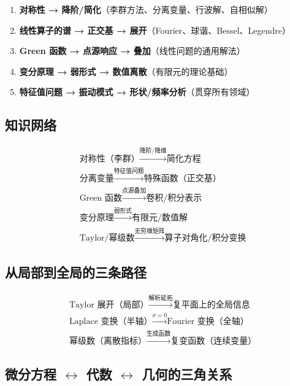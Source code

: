 \begin{enumerate}
  \item \textbf{对称性 → 降阶/简化}（李群方法、分离变量、行波解、自相似解）
  \item \textbf{线性算子的谱 → 正交基 → 展开}（Fourier、球谐、Bessel、Legendre）
  \item \textbf{Green 函数 → 点源响应 → 叠加}（线性问题的通用解法）
  \item \textbf{变分原理 → 弱形式 → 数值离散}（有限元的理论基础）
  \item \textbf{特征值问题 → 振动模式 → 形状/频率分析}（贯穿所有领域）
\end{enumerate}

\subsection{知识网络}

\[
\boxed{
\begin{aligned}
&\text{对称性（李群）} \xrightarrow{\text{降阶/降维}} \text{简化方程} \\
&\text{分离变量} \xrightarrow{\text{特征值问题}} \text{特殊函数（正交基）} \\
&\text{Green 函数} \xrightarrow{\text{点源叠加}} \text{卷积/积分表示} \\
&\text{变分原理} \xrightarrow{\text{弱形式}} \text{有限元/数值解} \\
&\text{Taylor/幂级数} \xrightarrow{\text{无穷维矩阵}} \text{算子对角化/积分变换}
\end{aligned}
}
\]

\subsection{从局部到全局的三条路径}

\[
\boxed{
\begin{aligned}
&\text{Taylor 展开（局部）} \xrightarrow{\text{解析延拓}} \text{复平面上的全局信息} \\
&\text{Laplace 变换（半轴）} \xrightarrow{\sigma = 0} \text{Fourier 变换（全轴）} \\
&\text{幂级数（离散指标）} \xrightarrow{\text{生成函数}} \text{复变函数（连续变量）}
\end{aligned}
}
\]

\subsection{微分方程 $\leftrightarrow$ 代数 $\leftrightarrow$ 几何的三角关系}

